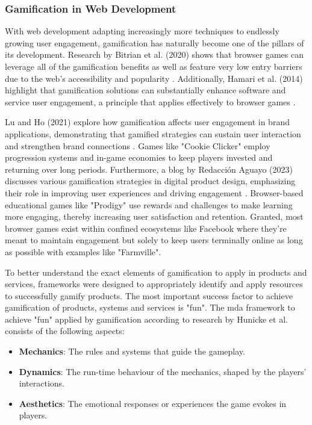 \subsubsection{Gamification in Web Development}

With web development adapting increasingly more techniques to endlessly growing user engagement, gamification has naturally become one of the pillars of its development. 
Research by Bitrian et al. (2020) shows that browser games can leverage all of the gamification benefits as well as feature very low entry barriers due to the web's accessibility and popularity \cite{roleOfMobile}. 
Additionally, Hamari et al. (2014) highlight that gamification solutions can substantially enhance software and service user engagement, a principle that applies effectively to browser games \cite{doesItWork}.

Lu and Ho (2021) explore how gamification affects user engagement in brand applications, demonstrating that gamified strategies can sustain user interaction and strengthen brand connections \cite{sustainability}. 
Games like "Cookie Clicker" employ progression systems and in-game economies to keep players invested and returning over long periods. 
Furthermore, a blog by Redacción Aguayo (2023) discusses various gamification strategies in digital product design, emphasizing their role in improving user experiences and driving engagement \cite{UXdesign}. 
Browser-based educational games like "Prodigy" use rewards and challenges to make learning more engaging, thereby increasing user satisfaction and retention.
Granted, most browser games exist within confined ecosystems like Facebook where they're meant to maintain engagement but solely to keep users terminally online as long as possible with examples like "Farmville".

To better understand the exact elements of gamification to apply in products and services, frameworks were designed to appropriately identify and apply resources to successfully gamify products. 
The most important success factor to achieve gamification of products, systems and services is "fun". 
The \acrshort{mda} framework to achieve "fun" applied by gamification according to research by Hunicke et al. consists of the following aspects\cite{sustainability}:

\begin{itemize}
    \item \textbf{Mechanics}:  The rules and systems that guide the gameplay.
    \item \textbf{Dynamics}:  The run-time behaviour of the mechanics, shaped by the players' interactions.
    \item \textbf{Aesthetics}:  The emotional responses or experiences the game evokes in players.
\end{itemize}

